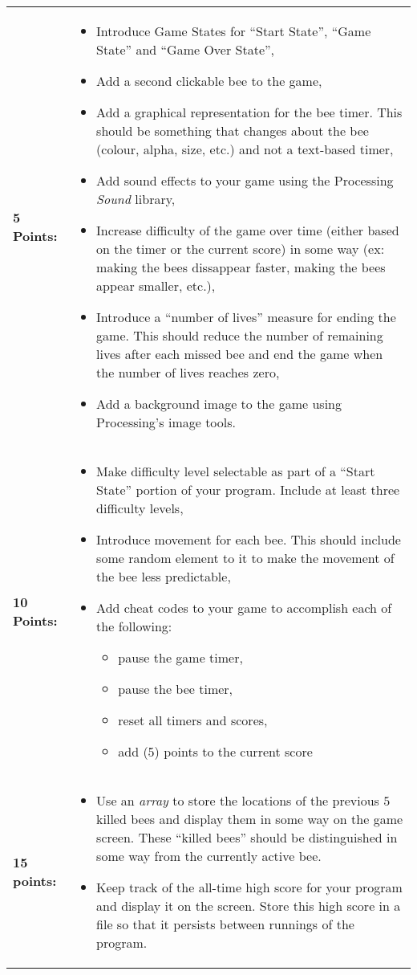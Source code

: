 		\begin{tabular}{p{} p{}}
			\textbf{5 Points:} & \begin{itemize}
				\item Introduce Game States for ``Start State'', ``Game State'' and ``Game Over State'',
				\item Add a second clickable bee to the game,
				\item Add a graphical representation for the bee timer. This should be something that changes about the bee (colour, alpha, size, etc.) and not a text-based timer,
				\item Add sound effects to your game using the Processing \emph{Sound} library,
				\item Increase difficulty of the game over time (either based on the timer or the current score) in some way (ex: making the bees dissappear faster, making the bees appear smaller, etc.),
				\item Introduce a ``number of lives'' measure for ending the game. This should reduce the number of remaining lives after each missed bee and end the game when the number of lives reaches zero,
				\item Add a background image to the game using Processing's image tools.
			\end{itemize} \\
			\textbf{10 Points:} & \begin{itemize}
				\item Make difficulty level selectable as part of a ``Start State'' portion of your program. Include at least three difficulty levels,
				\item Introduce movement for each bee. This should include some random element to it to make the movement of the bee less predictable,
				\item Add cheat codes to your game to accomplish each of the following:
					\begin{itemize}
						\item pause the game timer,
						\item pause the bee timer,
						\item reset all timers and scores,
						\item add (5) points to the current score
					\end{itemize}
			\end{itemize} \\
			\textbf{15 points:} & \begin{itemize}
				\item Use an \emph{array} to store the locations of the previous $5$ killed bees and display them in some way on the game screen. These ``killed bees'' should be distinguished in some way from the currently active bee.
				\item Keep track of the all-time high score for your program and display it on the screen. Store this high score in a file so that it persists between runnings of the program.
			\end{itemize}
		\end{tabular}

